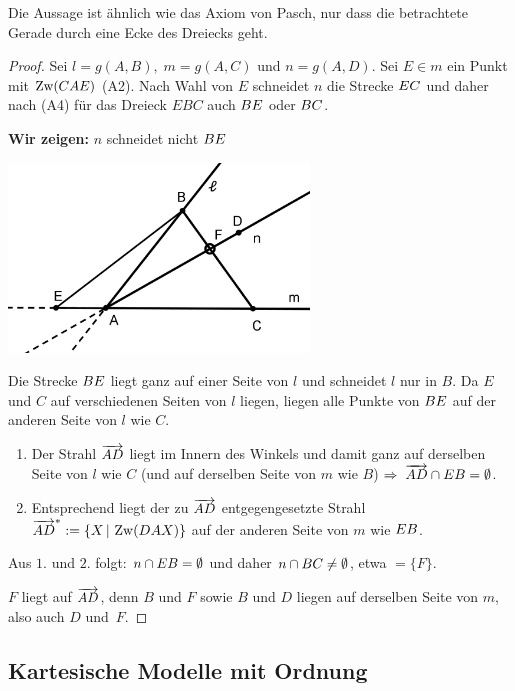 Die Aussage ist ähnlich wie das Axiom von Pasch, nur dass die betrachtete Gerade durch eine Ecke des
Dreiecks geht.

\begin{proof}
    Sei $l = g(A,B),\; m = g(A,C)$ und $n = g(A,D)$. Sei $E \in m$ ein Punkt mit $\operatorname{Zw}(CAE)$ (A2).
    Nach Wahl von $E$ schneidet $n$ die Strecke ${EC}$ und daher nach (A4) für das Dreieck $EBC$
    auch ${BE}$ oder ${BC}$.

    {\bf Wir zeigen:} $n$ schneidet nicht ${BE}$

    \centerline{\includegraphics[width=8cm]{BILDER/1-1-09-Satz.png}}

    Die Strecke ${BE}$ liegt ganz auf einer Seite von $l$ und schneidet $l$ nur in $B$. Da $E$
    und $C$ auf verschiedenen Seiten von $l$ liegen, liegen alle Punkte von ${BE}$ auf der
    anderen Seite von $l$ wie $C$.
    \renewcommand{\labelenumi}{\arabic{enumi}.} %
    \begin{enumerate}
        \item Der Strahl $\mbox{${\overrightarrow{AD}}$}$ liegt im Innern des Winkels und damit ganz auf derselben Seite
            von $l$ wie $C$ (und auf derselben Seite von $m$ wie $B$) $\Rightarrow\;
            \mbox{${\overrightarrow{AD}}$} \cap {EB} = \emptyset$.

        \item Entsprechend liegt der zu $\mbox{${\overrightarrow{AD}}$}$ entgegengesetzte Strahl $\mbox{${\overrightarrow{AD}}$}^* := \{X \, | \,
            \operatorname{Zw}(DAX)\}$ auf der anderen Seite von $m$ wie ${EB}$.
    \end{enumerate}
    Aus $1.$ und $2.$ folgt: $n \cap {EB} = \emptyset$ und daher $n \cap {BC} \neq
    \emptyset$, etwa $= \{F\}$.

    $F$ liegt auf $\mbox{${\overrightarrow{AD}}$}$, denn $B$ und $F$ sowie $B$ und $D$ liegen auf derselben Seite von $m$,
    also auch $D$ und~$F$.
\end{proof}

\subsection{Kartesische Modelle mit Ordnung}

